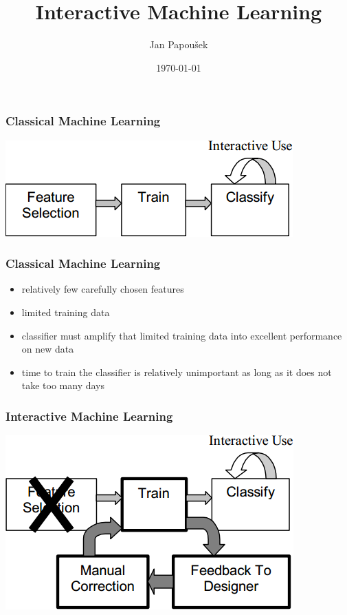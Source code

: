 \documentclass[xcolor=svgnames]{beamer}
\title{Interactive Machine Learning}
\author{Jan Papoušek}
\institute{Masaryk University Brno}
\date{\today}
\begin{document}
\frame[plain]{\titlepage}
\begin{frame}
	\frametitle{Classical Machine Learning}
	\begin{center}
		\includegraphics[width=.75\textwidth]{2013-IA080-interactive-machine-learning/cml.png}
	\end{center}
\end{frame}
\begin{frame}
	\frametitle{Classical Machine Learning}
	\begin{itemize}
		\item relatively few carefully chosen features
		\item limited training data
		\item classifier must amplify that limited training data
					into excellent performance on new data
		\item time to train the classifier is relatively unimportant as
					long as it does not take too many days
	\end{itemize}
\end{frame}
\begin{frame}
	\frametitle{Interactive Machine Learning}
	\begin{center}
		\includegraphics[width=.75\textwidth]{2013-IA080-interactive-machine-learning/iml.png}
	\end{center}
\end{frame}
\end{document}
